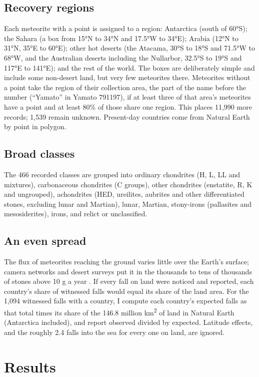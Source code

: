 \documentclass[11pt,a4paper]{article}
\begin{document}
\subsection{Recovery regions}
Each meteorite with a point is assigned to a region: Antarctica (south of 60°S); the Sahara (a box from 15°N to 34°N and 17.5°W to 34°E); Arabia (12°N to 31°N, 35°E to 60°E); other hot deserts (the Atacama, 30°S to 18°S and 71.5°W to 68°W, and the Australian deserts including the Nullarbor, 32.5°S to 19°S and 117°E to 141°E); and the rest of the world. The boxes are deliberately simple and include some non-desert land, but very few meteorites there. Meteorites without a point take the region of their collection area, the part of the name before the number (``Yamato'' in Yamato 791197), if at least three of that area's meteorites have a point and at least 80\% of those share one region. This places 11,990 more records; 1,539 remain unknown. Present-day countries come from Natural Earth by point in polygon.

\subsection{Broad classes}
The 466 recorded classes are grouped into ordinary chondrites (H, L, LL and mixtures), carbonaceous chondrites (C groups), other chondrites (enstatite, R, K and ungrouped), achondrites (HED, ureilites, aubrites and other differentiated stones, excluding lunar and Martian), lunar, Martian, stony-irons (pallasites and mesosiderites), irons, and relict or unclassified.

\subsection{An even spread}
The flux of meteorites reaching the ground varies little over the Earth's surface; camera networks and desert surveys put it in the thousands to tens of thousands of stones above 10 g a year \citep{halliday,bland}. If every fall on land were noticed and reported, each country's share of witnessed falls would equal its share of the land area. For the 1,094 witnessed falls with a country, I compute each country's expected falls as that total times its share of the 146.8 million km\textsuperscript{2} of land in Natural Earth (Antarctica included), and report observed divided by expected. Latitude effects, and the roughly 2.4 falls into the sea for every one on land, are ignored.

\section{Results}
\end{document}
